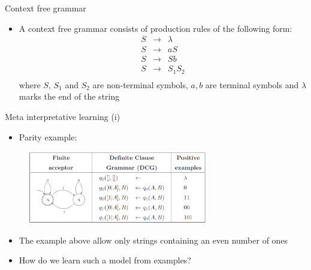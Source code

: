 \begin{frame}{Context free grammar}
\begin{itemize}
    \item A context free grammar consists of production rules of the following form:
    \begin{eqnarray*}
    S &\rightarrow& \lambda \\   
    S &\rightarrow& aS \\   
    S &\rightarrow& Sb \\   
    S &\rightarrow& S_1S_2 \\   
    \end{eqnarray*}
    where $S$, $S_1$ and $S_2$ are non-terminal symbols, $a,b$ are terminal symbols and $\lambda$ marks the end of the string
\end{itemize}
\end{frame}

\begin{frame}{Meta interpretative learning (i)}
\begin{itemize}
    \item Parity example:
\end{itemize}
\begin{figure}
    \centering
    \includegraphics[width = 0.7\textwidth]{images/parity schema.png}
\end{figure}
\begin{itemize}
\item The example above allow only strings containing an even number of ones 
\item How do we learn such a model from examples?
\end{itemize}
\end{frame}

